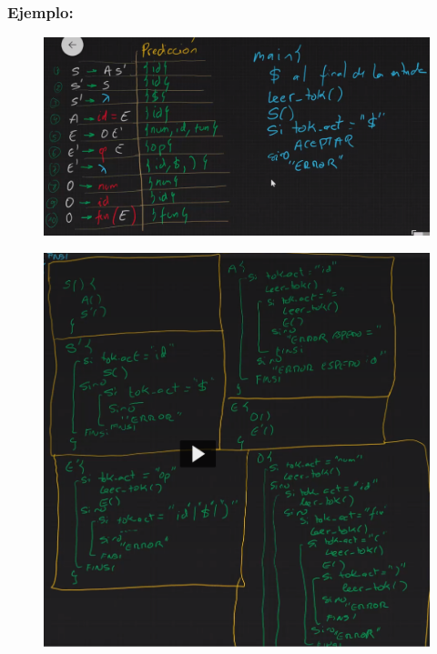 \documentclass[12pt]{report} %
\begin{document}
\pagebreak

\subsubsection{Ejemplo:}

\begin{figure}[H]
	{\includegraphics[scale=.4]{2021-03-26 17_49_53-Ejercicio descendente recursivo.png}}
\end{figure}

\begin{figure}[H]
	{\includegraphics[scale=.5]{Untitled 102.png}}
\end{figure}
\end{document}
